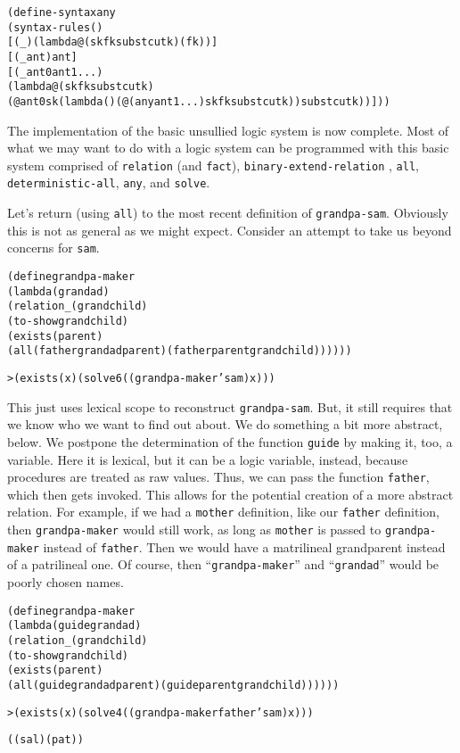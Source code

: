 \begin{alltt}
(define-syntax any
  (syntax-rules ()
    [(_) (lambda@ (sk fk subst cutk) (fk))]
    [(_ ant) ant]
    [(_ ant0 ant1 ...)
     (lambda@ (sk fk subst cutk)
       (@ ant0 sk (lambda () (@ (any ant1 ...) sk fk subst cutk)) subst cutk))]))
\end{alltt}

The implementation of the basic unsullied logic system is now
complete.  Most of what we may want to do with a logic system can be
programmed with this basic system comprised of \texttt{relation}
(and \texttt{fact}), \texttt{binary-extend-relation} , \texttt{all},
\texttt{deterministic-all}, \texttt{any}, and \texttt{solve}.

Let's return (using \texttt{all}) to the most recent definition of
\texttt{grandpa-sam}.  Obviously this is not as general as we might
expect.  Consider an attempt to take us beyond concerns for
\texttt{sam}.

\begin{alltt}
(define grandpa-maker
  (lambda (grandad)
    (relation _ (grandchild)
      (to-show grandchild)
      (exists (parent)
        (all (father grandad parent) (father parent grandchild))))))

> (exists (x) (solve 6 ((grandpa-maker 'sam) x)))
\end{alltt}

\noindent
This just uses lexical scope to reconstruct \texttt{grandpa-sam}.
But, it still requires that we know who we want to find out about. We
do something a bit more abstract, below.  We postpone the
determination of the function \texttt{guide} by making it, too, a
variable. Here it is lexical, but it can be a logic variable, instead,
because procedures are treated as raw values.  Thus, we can pass the function
\texttt{father}, which then gets invoked.  This allows for the
potential creation of a more abstract relation.  For example, if we
had a \texttt{mother} definition, like our \texttt{father} definition,
then \texttt{grandpa-maker} would still work, as long as
\texttt{mother} is passed to \texttt{grandpa-maker} instead of
\texttt{father}.  Then we would have a matrilineal grandparent instead
of a patrilineal one.  Of course, then ``\texttt{grandpa-maker}'' and
``\texttt{grandad}'' would be poorly chosen names.

\begin{alltt}
(define grandpa-maker
  (lambda (guide grandad)
    (relation _ (grandchild)
      (to-show grandchild)
      (exists (parent)
        (all (guide grandad parent) (guide parent grandchild))))))

> (exists (x) (solve 4 ((grandpa-maker father 'sam) x)))

((sal) (pat))
\end{alltt}


